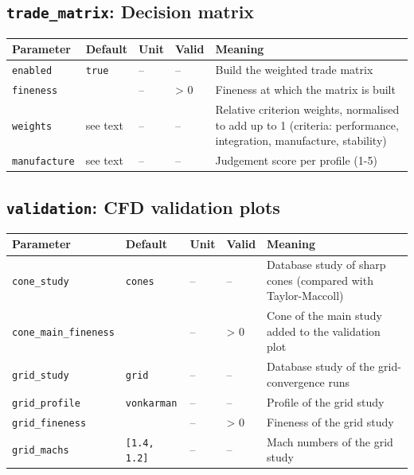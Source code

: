 \subsection*{\texttt{trade\_matrix}: Decision matrix}
{\footnotesize
\begin{longtable}{@{}>{\raggedright\arraybackslash}p{3.3cm}>{\raggedright\arraybackslash}p{2.6cm}>{\raggedright\arraybackslash}p{1.3cm}>{\raggedright\arraybackslash}p{1.9cm}>{\raggedright\arraybackslash}p{6.1cm}@{}}
\toprule Parameter & Default & Unit & Valid & Meaning \\ \midrule \endhead \bottomrule \endfoot
\texttt{enabled} & \texttt{true} & -- & -- & Build the weighted trade matrix \\
\texttt{fineness} & 4.5 & -- & > 0 & Fineness at which the matrix is built \\
\texttt{weights} & see text & -- & -- & Relative criterion weights, normalised to add up to 1 (criteria: performance, integration, manufacture, stability) \\
\texttt{manufacture} & see text & -- & -- & Judgement score per profile (1-5) \\
\end{longtable}\addtocounter{table}{-1}}

\subsection*{\texttt{validation}: CFD validation plots}
{\footnotesize
\begin{longtable}{@{}>{\raggedright\arraybackslash}p{3.3cm}>{\raggedright\arraybackslash}p{2.6cm}>{\raggedright\arraybackslash}p{1.3cm}>{\raggedright\arraybackslash}p{1.9cm}>{\raggedright\arraybackslash}p{6.1cm}@{}}
\toprule Parameter & Default & Unit & Valid & Meaning \\ \midrule \endhead \bottomrule \endfoot
\texttt{cone\_study} & \texttt{cones} & -- & -- & Database study of sharp cones (compared with Taylor-Maccoll) \\
\texttt{cone\_main\_fineness} & 4 & -- & > 0 & Cone of the main study added to the validation plot \\
\texttt{grid\_study} & \texttt{grid} & -- & -- & Database study of the grid-convergence runs \\
\texttt{grid\_profile} & \texttt{vonkarman} & -- & -- & Profile of the grid study \\
\texttt{grid\_fineness} & 4 & -- & > 0 & Fineness of the grid study \\
\texttt{grid\_machs} & \texttt{[1.4, 1.2]} & -- & -- & Mach numbers of the grid study \\
\end{longtable}\addtocounter{table}{-1}}

